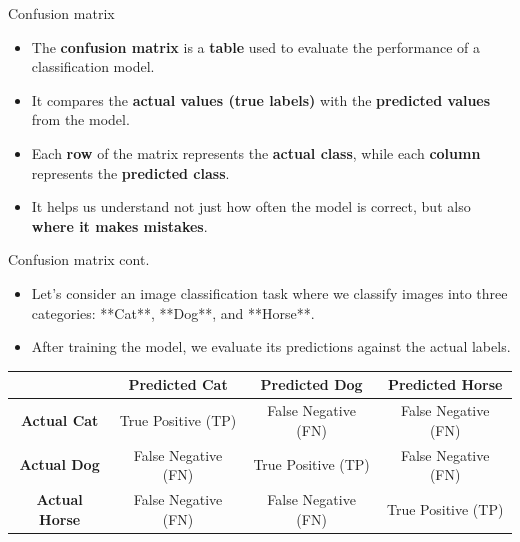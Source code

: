 \documentclass[serif, aspectratio=169]{beamer}
\begin{document}
            

\begin{frame}{Confusion matrix}
    \begin{itemize}
        \item The \textbf{confusion matrix} is a \textbf{table} used to evaluate the performance of a classification model.
        \item It compares the \textbf{actual values (true labels)} with the \textbf{predicted values} from the model.
        \item Each \textbf{row} of the matrix represents the \textbf{actual class}, while each \textbf{column} represents the \textbf{predicted class}.
        \item It helps us understand not just how often the model is correct, but also \textbf{where it makes mistakes}.
    \end{itemize}
    
\end{frame}


\begin{frame}{Confusion matrix cont.}
    \begin{itemize}
        \item Let's consider an image classification task where we classify images into three categories: **Cat**, **Dog**, and **Horse**.
        \item After training the model, we evaluate its predictions against the actual labels.
    \end{itemize}
    
    \vfill
    \centering
    \begin{tabular}{|c|c|c|c|}
    \hline
    & \textbf{Predicted Cat} & \textbf{Predicted Dog} & \textbf{Predicted Horse} \\
    \hline
    \textbf{Actual Cat} & True Positive (TP) & False Negative (FN) & False Negative (FN) \\
    \hline
    \textbf{Actual Dog} & False Negative (FN) & True Positive (TP) & False Negative (FN) \\
    \hline
    \textbf{Actual Horse} & False Negative (FN) & False Negative (FN) & True Positive (TP) \\
    \hline
    \end{tabular}
\end{frame}
\end{document}
